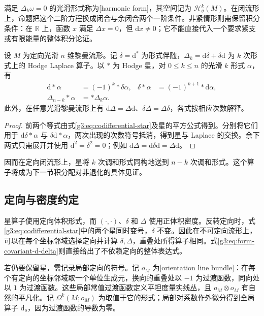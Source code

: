 满足 \(\Delta_k\omega=0\) 的光滑形式称为[harmonic form]，其空间记为 \(\mathcal H_g^k(M)\)。在闭流形上，命题把这个二阶方程换成闭合与余闭合两个一阶条件。非紧情形则需保留积分条件：在 \(\mathbb R\) 上，函数 \(x\) 满足 \(\Delta x=0\)，但 \(\mathrm dx\ne0\)；它不能直接代入一个要求紧支或有限能量的整体积分论证。

\begin{proposition}\label{g3:prop:hodge-star-commutes}
	设 \(M\) 为定向光滑 \(n\) 维黎曼流形。记 \(\delta=\mathrm d^*\) 为形式伴随，\(\Delta_k=\mathrm d\delta+\delta\mathrm d\) 为 \(k\) 次形式上的 Hodge Laplace 算子。以 \(*\) 为 Hodge 星，对 \(0\le k\le n\) 的光滑 \(k\) 形式 \(\alpha\)，有
	\begin{align*}
		\mathrm d*\alpha&=(-1)^k*\delta\alpha,&
		\delta*\alpha&=(-1)^{k+1}*\mathrm d\alpha,\\
		\Delta_{n-k}*\alpha&=*\Delta_k\alpha.
	\end{align*}
	此外，在任意光滑黎曼流形上有 \(\mathrm d\Delta=\Delta\mathrm d\)、\(\delta\Delta=\Delta\delta\)，各式按相应次数解释。
\end{proposition}
\begin{proof}
	前两个等式由式\eqref{g3:eq:codifferential-star}及星的平方公式得到。分别将它们用于 \(\mathrm d\delta*\alpha\) 与 \(\delta\mathrm d*\alpha\)，两次出现的次数符号抵消，得到星与 Laplace 的交换。余下两式只需展开并使用 \(\mathrm d^2=\delta^2=0\)；例如 \(\mathrm d\Delta=\mathrm d\delta\mathrm d=\Delta\mathrm d\)。
\end{proof}

因而在定向闭流形上，星将 \(k\) 次调和形式同构地送到 \(n-k\) 次调和形式。这个算子将成为下一节积分配对非退化的具体见证。

\subsection{定向与密度约定}
\label{g3:subsec:1501:04}
星算子使用定向体积形式，而 \((\cdot,\cdot)\)、\(\delta\) 和 \(\Delta\) 使用正体积密度。反转定向时，式\eqref{g3:eq:codifferential-star}中的两个星同时变号，\(\delta\) 不变。因此在不可定向流形上，可以在每个坐标邻域选择定向并计算 \(\delta,\Delta\)，重叠处所得算子相同。式\eqref{g3:eq:form-covariant-d-delta}则直接给出了不依赖定向的整体表达式。

\ProseParagraphBreak

若仍要保留星，需记录局部定向的符号。记 \(o_M\) 为[orientation line bundle]：在每个有定向的坐标邻域取一个单位生成元，换向的重叠处以 \(-1\) 为过渡函数，同向处以 \(1\) 为过渡函数。这些局部常值过渡函数定义平坦度量实线丛，且 \(o_M\otimes o_M\) 有自然的平凡化。记 \(\Omega^k(M;o_M)\) 为取值于它的形式；局部对系数作外微分得到全局算子 \(\mathrm d_o\)，因为过渡函数的导数为零。

